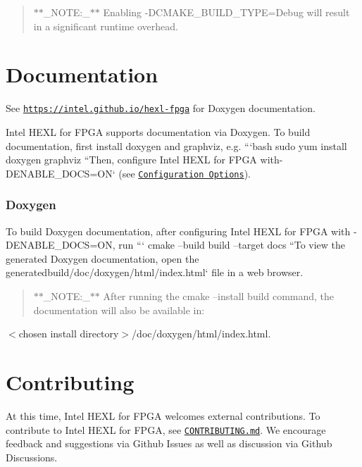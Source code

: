 \begin{quotation}
$\ast$$\ast$\-\_\-\-N\-O\-T\-E\-:\-\_\-$\ast$$\ast$ Enabling {\ttfamily -\/\-D\-C\-M\-A\-K\-E\-\_\-\-B\-U\-I\-L\-D\-\_\-\-T\-Y\-P\-E=Debug} will result in a significant runtime overhead. \par


\end{quotation}


\section*{Documentation}

See \href{https://intel.github.io/hexl-fpga}{\tt https\-://intel.\-github.\-io/hexl-\/fpga} for Doxygen documentation. \par


Intel H\-E\-X\-L for F\-P\-G\-A supports documentation via Doxygen. To build documentation, first install {\ttfamily doxygen} and {\ttfamily graphviz}, e.\-g. ```bash sudo yum install doxygen graphviz ``{\ttfamily  Then, configure Intel H\-E\-X\-L for F\-P\-G\-A with}-\/\-D\-E\-N\-A\-B\-L\-E\-\_\-\-D\-O\-C\-S=O\-N` (see \href{#configuration-options}{\tt Configuration Options}). \subsubsection*{Doxygen}

To build Doxygen documentation, after configuring Intel H\-E\-X\-L for F\-P\-G\-A with {\ttfamily -\/\-D\-E\-N\-A\-B\-L\-E\-\_\-\-D\-O\-C\-S=O\-N}, run ``` cmake --build build --target docs ``{\ttfamily  To view the generated Doxygen documentation, open the generated}build/doc/doxygen/html/index.\-html` file in a web browser. \begin{quotation}
$\ast$$\ast$\-\_\-\-N\-O\-T\-E\-:\-\_\-$\ast$$\ast$ After running the cmake --install build command, the documentation will also be available in\-: \par


\end{quotation}
{\ttfamily $<$chosen install directory$>$/doc/doxygen/html/index.html}.

\section*{Contributing}

At this time, Intel H\-E\-X\-L for F\-P\-G\-A welcomes external contributions. To contribute to Intel H\-E\-X\-L for F\-P\-G\-A, see \href{CONTRIBUTING.md}{\tt C\-O\-N\-T\-R\-I\-B\-U\-T\-I\-N\-G.\-md}. We encourage feedback and suggestions via Github Issues as well as discussion via Github Discussions.

